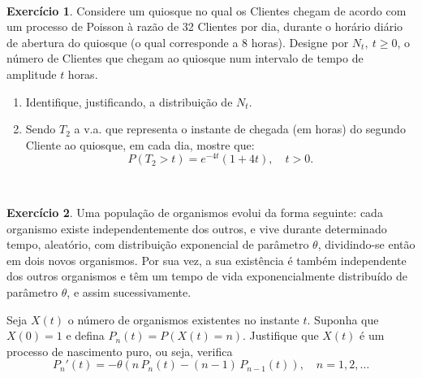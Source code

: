 \documentclass[
  11pt,
  a4paper,
]{book}
\theoremstyle{definition}
\theoremstyle{definition}
\theoremstyle{definition}
\newtheorem{exercise}{Exercício}[chapter]
\theoremstyle{definition}
\theoremstyle{remark}
\begin{document}
\(\,\)

\begin{exercise}
\leavevmode

Considere um quiosque no qual os Clientes chegam de acordo com um processo de Poisson à razão de 32 Clientes por dia, durante o horário diário de abertura do quiosque (o qual corresponde a 8 horas). Designe por \(N_t, ~t \geq 0\), o número de Clientes que chegam ao quiosque num intervalo de tempo de amplitude \(t\) horas.

\begin{enumerate}
\def\labelenumi{\alph{enumi})}
\item
  Identifique, justificando, a distribuição de \(N_t\).
\item
  Sendo \(T_2\) a v.a. que representa o instante de chegada (em horas) do segundo Cliente ao quiosque, em cada dia, mostre que:
  \[P(T_2>t)=e^{-4t}(1+4t), \quad t>0.\]
\end{enumerate}

\end{exercise}

\(\,\)

\begin{exercise}
\leavevmode

Uma população de organismos evolui da forma seguinte: cada organismo existe independentemente dos outros, e vive durante determinado tempo, aleatório, com distribuição exponencial de parâmetro \(\theta\), dividindo-se então em dois novos organismos. Por sua vez, a sua existência é também independente dos outros organismos e têm um tempo de vida exponencialmente distribuído de parâmetro \(\theta\), e assim sucessivamente.

Seja \(X(t)\) o número de organismos existentes no instante \(t\). Suponha que \(X(0) = 1\) e defina \(P_n(t) = P(X(t) = n)\). Justifique que \(X(t)\) é um processo de nascimento puro, ou seja, verifica
\[
P_n'(t) = -\theta \left( n\,P_n(t) - (n-1)\,P_{n-1}(t) \right), \quad n = 1,2,\ldots
\]

\end{exercise}

\(\,\)
\end{document}
